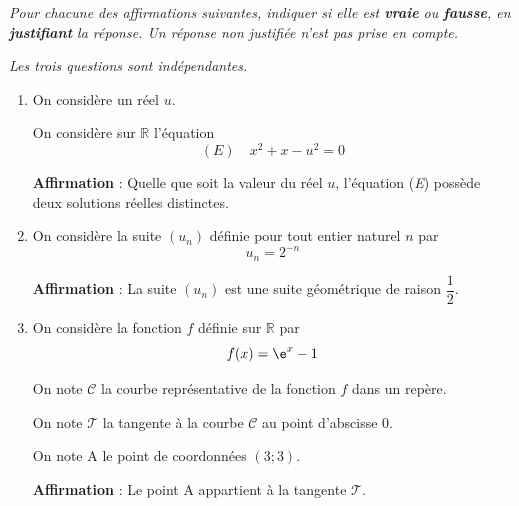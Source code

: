 \textit{Pour chacune des affirmations suivantes, indiquer si elle est \textbf{vraie} ou \textbf{fausse}, en \textbf{justifiant} la réponse. Un réponse non justifiée n'est pas prise en compte.}

\begin{center}
	\textit{Les trois questions sont indépendantes.}
\end{center}

\begin{enumerate}[itemsep=5mm]
	\item On considère un réel $u$.

	On considère sur $\mathbb{R}$ l'équation
	\[(E)\quad x^2+x-u^2=0\]

	\textbf{Affirmation} : Quelle que soit la valeur du réel $u$, l'équation (\textit{E}) possède deux solutions réelles distinctes.

	\item On considère la suite \mbox{$(u_n)$} définie pour tout entier naturel $n$ par
	\[u_n=2^{-n}\]

	\textbf{Affirmation} : La suite \mbox{$(u_n)$} est une suite géométrique de raison \mbox{$\dfrac12$}.

	\item On considère la fonction $f$ définie sur $\mathbb{R}$ par
	\[f(x)=\e^x-1\]

	On note \mbox{$\mathcal{C}$} la courbe représentative de la fonction $f$ dans un repère.

	On note \mbox{$\mathcal{T}$} la tangente à la courbe \mbox{$\mathcal{C}$} au point d'abscisse $0$.

	On note A le point de coordonnées \mbox{$(3;3)$.}

	\textbf{Affirmation} : Le point A appartient à la tangente \mbox{$\mathcal{T}$}.
\end{enumerate}
